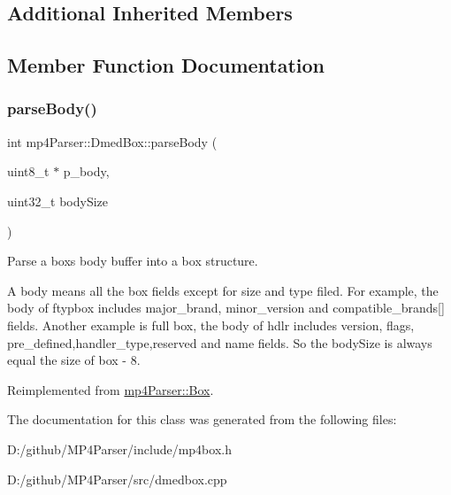 \subsection*{Additional Inherited Members}


\subsection{Member Function Documentation}
\mbox{\label{classmp4_parser_1_1_dmed_box_a34c87ade60a56d01a0b809aa067e955c}} 
\subsubsection{\texorpdfstring{parseBody()}{parseBody()}}
{\footnotesize\ttfamily int mp4\+Parser\+::\+Dmed\+Box\+::parse\+Body (\begin{DoxyParamCaption}\item[{uint8\+\_\+t $\ast$}]{p\+\_\+body,  }\item[{uint32\+\_\+t}]{body\+Size }\end{DoxyParamCaption})\hspace{0.3cm}{\ttfamily [virtual]}}



Parse a box\textquotesingle{}s body buffer into a box structure. 

A body means all the box fields except for size and type filed. For example, the body of ftypbox includes major\+\_\+brand, minor\+\_\+version and compatible\+\_\+brands\mbox{[}\mbox{]} fields. Another example is full box, the body of hdlr includes version, flags, pre\+\_\+defined,handler\+\_\+type,reserved and name fields. So the body\+Size is always equal the size of box -\/ 8. 

Reimplemented from \mbox{\hyperlink{classmp4_parser_1_1_box_a3dd0c084ac65bc77b69ac5ecaf796cb2}{mp4\+Parser\+::\+Box}}.



The documentation for this class was generated from the following files\+:\begin{DoxyCompactItemize}
\item 
D\+:/github/\+M\+P4\+Parser/include/mp4box.\+h\item 
D\+:/github/\+M\+P4\+Parser/src/dmedbox.\+cpp\end{DoxyCompactItemize}
